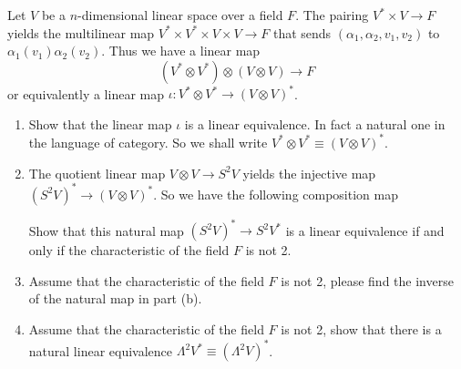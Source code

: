 \begin{problem}
Let $V$ be a $n$-dimensional linear space over a field $F$. The pairing $V^* \times V \to F$ yields the multilinear map $V^* \times V^* \times V \times V \to F$ that sends $(\alpha_1, \alpha_2, v_1, v_2)$ to $\alpha_1(v_1) \alpha_2(v_2)$. Thus we have a linear map
\[
	(V^* \otimes V^*) \otimes (V \otimes V) \to F
\]
or equivalently a linear map $\iota : V^* \otimes V^* \to {(V \otimes V)}^*$.
\begin{enumerate}
	\item Show that the linear map $\iota$ is a linear equivalence. In fact a natural one in the language of category. So we shall write $V^* \otimes V^* \equiv {(V \otimes V)}^*$.
	\item The quotient linear map $V \otimes V \to S^2 V$ yields the injective map ${(S^2 V)}^* \to {(V \otimes V)}^*$. So we have the following composition map
	      \begin{center}
	      \end{center}
	      Show that this natural map ${(S^2 V)}^* \to S^2 V^*$ is a linear equivalence if and only if the characteristic of the field $F$ is not 2.
	\item Assume that the characteristic of the field $F$ is not 2, please find the inverse of the natural map in part (b).
	\item Assume that the characteristic of the field $F$ is not 2, show that there is a natural linear equivalence $\Lambda^2 V^* \equiv {(\Lambda^2 V)}^*$.
\end{enumerate}
\end{problem}

